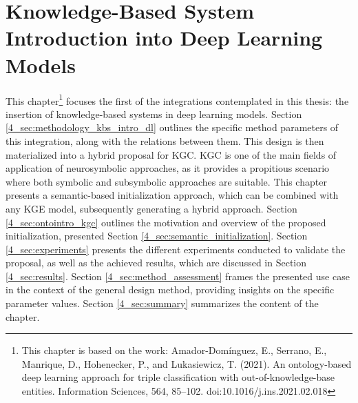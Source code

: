 \chapter{Knowledge-Based System Introduction into Deep Learning Models}\label{chap:kbsintegrationdl}

This chapter\footnote{This chapter is based on the work: Amador-Domínguez, E., Serrano, E., Manrique, D., Hohenecker, P., and Lukasiewicz, T. (2021). An ontology-based deep learning approach for triple classification with out-of-knowledge-base entities. Information Sciences, 564, 85–102. doi:10.1016/j.ins.2021.02.018} focuses the first of the integrations contemplated in this thesis: the insertion of knowledge-based systems in deep learning models. Section \ref{4_sec:methodology_kbs_intro_dl} outlines the specific method parameters of this integration, along with the relations between them. This design is then materialized into a hybrid proposal for KGC. KGC is one of the main fields of application of neurosymbolic approaches, as it provides a propitious scenario where both symbolic and subsymbolic approaches are suitable. This chapter presents a semantic-based initialization approach, which can be combined with any KGE model, subsequently generating a hybrid approach. Section \ref{4_sec:ontointro_kgc} outlines the motivation and overview of the proposed initialization, presented Section \ref{4_sec:semantic_initialization}. Section \ref{4_sec:experiments} presents the different experiments conducted to validate the proposal, as well as the achieved results, which are discussed in Section \ref{4_sec:results}. Section \ref{4_sec:method_assessment} frames the presented use case in the context of the general design method, providing insights on the specific parameter values. Section \ref{4_sec:summary} summarizes the content of the chapter. 

